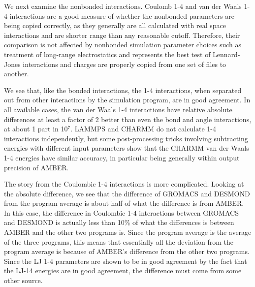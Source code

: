 We next examine the nonbonded interactions. Coulomb 1-4 and van der
Waals 1-4 interactions are a good measure of whether the nonbonded
parameters are being copied correctly, as they generally are all
calculated with real space interactions and are shorter range than any
reasonable cutoff. Therefore, their comparison is not affected by
nonbonded simulation parameter choices such as treatment of long-range
electrostatics and represents the best test of Lennard-Jones
interactions and charges are properly copied from one set of files to
another.

We see that, like the bonded interactions, the 1-4 interactions, when
separated out from other interactions by the simulation program, are
in good agreement.  In all available cases, the van der Waals 1-4
interactions have relative absolute differences at least a factor of 2
better than even the bond and angle interactions, at about 1 part in
10$^{7}$. LAMMPS and CHARMM do not calculate 1-4 interactions
independently, but some post-processing tricks involving subtracting
energies with different input parameters show that the CHARMM van der
Waals 1-4 energies have similar accuracy, in particular being
generally within output precision of AMBER.

The story from the Coulombic 1-4 interactions is more
complicated. Looking at the absolute difference, we see that the
difference of GROMACS and DESMOND from the program average is about
half of what the difference is from AMBER. In this case, the
difference in Coulombic 1-4 interactions between GROMACS and DESMOND
is actually less than 10\% of what the differences is between AMBER
and the other two programs is. Since the program average is the
average of the three programs, this means that essentially all the
deviation from the program average is because of AMBER's difference
from the other two programs.
Since the LJ 1-4 parameters are shown to be in good agreement by the fact that the LJ-14 energies are in good agreement, 
the difference must come from some other source.

